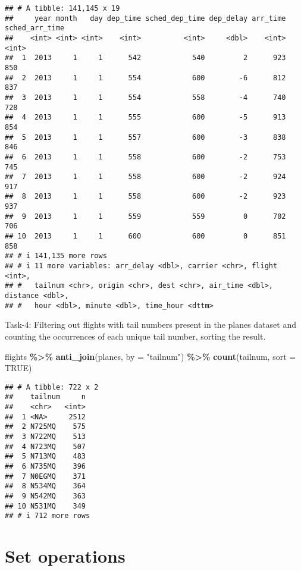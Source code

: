 \documentclass[
]{article}
\newenvironment{Shaded}{\begin{snugshade}}{\end{snugshade}}
\newcommand{\AttributeTok}[1]{\textcolor[rgb]{0.13,0.29,0.53}{#1}}
\newcommand{\ConstantTok}[1]{\textcolor[rgb]{0.56,0.35,0.01}{#1}}
\newcommand{\FunctionTok}[1]{\textcolor[rgb]{0.13,0.29,0.53}{\textbf{#1}}}
\newcommand{\NormalTok}[1]{#1}
\newcommand{\SpecialCharTok}[1]{\textcolor[rgb]{0.81,0.36,0.00}{\textbf{#1}}}
\newcommand{\StringTok}[1]{\textcolor[rgb]{0.31,0.60,0.02}{#1}}
\begin{document}
\begin{verbatim}
## # A tibble: 141,145 x 19
##     year month   day dep_time sched_dep_time dep_delay arr_time sched_arr_time
##    <int> <int> <int>    <int>          <int>     <dbl>    <int>          <int>
##  1  2013     1     1      542            540         2      923            850
##  2  2013     1     1      554            600        -6      812            837
##  3  2013     1     1      554            558        -4      740            728
##  4  2013     1     1      555            600        -5      913            854
##  5  2013     1     1      557            600        -3      838            846
##  6  2013     1     1      558            600        -2      753            745
##  7  2013     1     1      558            600        -2      924            917
##  8  2013     1     1      558            600        -2      923            937
##  9  2013     1     1      559            559         0      702            706
## 10  2013     1     1      600            600         0      851            858
## # i 141,135 more rows
## # i 11 more variables: arr_delay <dbl>, carrier <chr>, flight <int>,
## #   tailnum <chr>, origin <chr>, dest <chr>, air_time <dbl>, distance <dbl>,
## #   hour <dbl>, minute <dbl>, time_hour <dttm>
\end{verbatim}

Task-4: Filtering out flights with tail numbers present in the planes
dataset and counting the occurrences of each unique tail number, sorting
the result.

\begin{Shaded}
\begin{Highlighting}[]
\NormalTok{flights }\SpecialCharTok{\%\textgreater{}\%}
  \FunctionTok{anti\_join}\NormalTok{(planes, }\AttributeTok{by =} \StringTok{"tailnum"}\NormalTok{) }\SpecialCharTok{\%\textgreater{}\%}
  \FunctionTok{count}\NormalTok{(tailnum, }\AttributeTok{sort =} \ConstantTok{TRUE}\NormalTok{)}
\end{Highlighting}
\end{Shaded}

\begin{verbatim}
## # A tibble: 722 x 2
##    tailnum     n
##    <chr>   <int>
##  1 <NA>     2512
##  2 N725MQ    575
##  3 N722MQ    513
##  4 N723MQ    507
##  5 N713MQ    483
##  6 N735MQ    396
##  7 N0EGMQ    371
##  8 N534MQ    364
##  9 N542MQ    363
## 10 N531MQ    349
## # i 712 more rows
\end{verbatim}

\hypertarget{set-operations}{%
\section{Set operations}\label{set-operations}}
\end{document}
